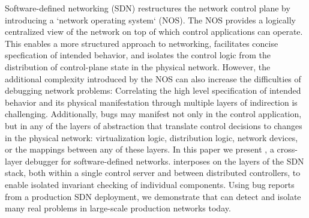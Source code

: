 Software-defined networking (SDN) restructures the network control plane
by introducing a `network operating system` (NOS). The NOS provides
a logically centralized view of the network on top of which control
applications can operate. This enables a more structured approach to
networking, facilitates concise specfication of intended behavior,
and isolates the control logic from the distribution of control-plane
state in the physical network.  However, the additional complexity
introduced by the NOS can also increase the difficulties of debugging
network problems: Correlating the high level specification
of intended behavior and its physical manifestation through multiple
layers of indirection is challenging. Additionally, bugs may manifest not only
in the control application, but in any of the layers of abstraction
that translate control decisions to changes in the physical network:
virtualization logic, distribution logic, network devices, or the mappings
between any of these layers. In this paper we present \projectname{},
a cross-layer debugger for software-defined networks. \projectname{}
interposes on the layers of the SDN stack, both within a single control
server and between distributed controllers, to enable isolated invariant
checking of individual components. Using bug reports from a production
SDN deployment, we demonstrate that \projectname{} can detect and isolate
many real problems in large-scale production networks today.
